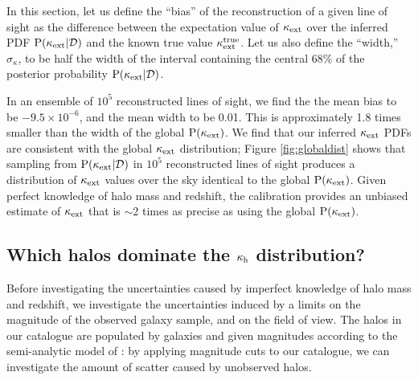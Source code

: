 \documentclass[useAMS,usenatbib,a4paper]{mn2e}
\begin{document}
In this section, let us define the ``bias'' of the reconstruction of a given
line of sight as the difference between the expectation value of $\kappa_{\rm ext}$ over
the inferred PDF ${\rm P}(\kappa_{\rm ext}|{\mathcal{D}})$ and the known true value $\kappa_{\rm ext}^{\mathrm{true}}$.
Let us also define the ``width,'' $\sigma_{\kappa}$, to be half the width of
the interval containing the central $68\%$ of the posterior probability
${\rm P}(\kappa_{\rm ext}|{\mathcal{D}})$. 

In an ensemble of $10^{5}$ reconstructed lines of sight, we find the the mean
bias to be $-9.5\times 10^{-6}$, and the mean width to be 0.01. This is
approximately 1.8 times smaller than the width of the global ${\rm P}(\kappa_{\rm ext})$. 
We find that our inferred $\kappa_{\rm ext}$ PDFs are consistent with the global
$\kappa_{\rm ext}$ distribution; Figure \ref{fig:globaldist} shows that sampling from
${\rm P}(\kappa_{\rm ext}|{\mathcal{D}})$ in $10^{5}$ reconstructed lines of sight produces a
distribution of $\kappa_{\rm ext}$ values over the sky identical to the global
${\rm P}(\kappa_{\rm ext})$. Given perfect knowledge of halo mass and redshift, the
calibration \proceedure provides an unbiased estimate of $\kappa_{\rm ext}$ that is
$\sim$2 times as precise as using the global ${\rm P}(\kappa_{\rm ext})$.


\subsection{Which halos dominate the $\kappa_{\rm h}$ distribution?}

Before investigating the uncertainties caused by imperfect knowledge of halo
mass and redshift, we investigate the uncertainties induced by a limits on the
magnitude of the observed galaxy sample, and on the field of view. The halos
in our catalogue are populated by galaxies and given magnitudes according to
the semi-analytic model of \citet{DeLucia+Blaizot2007}: by applying magnitude
cuts to our catalogue, we can investigate the amount of scatter caused by
unobserved halos. 
\end{document}
